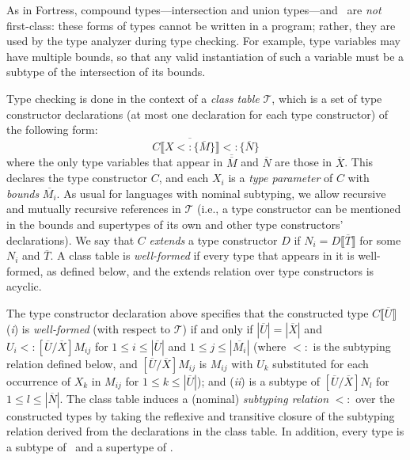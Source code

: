\documentclass[10pt]{sigplanconf}
\newcommand{\TODO}[1]{\textbf{\emph{\textcolor{red}{TODO}}}: \textsf{\footnotesize #1}}
\renewcommand{\bar}{\overline}
\newcommand{\extends}{\ensuremath{<:}}
\newcommand{\subtypeof}{\ensuremath{<:}}
\newcommand{\ob}[1]{\ensuremath{\llbracket {#1} \rrbracket}}
\newcommand{\obb}[1]{\ensuremath{\llbracket \bar{#1} \rrbracket}}
\newcommand{\bd}[1]{\ensuremath{\{\bar{#1}\}}}
\newcommand{\substb}[2]{\ensuremath{[\bar{#1}/\bar{#2}]}}
\newcommand{\bds}[2]{\ensuremath{\bar{{#1} \extends \bd{#2}}}}
\newcommand{\tplist}[2]{\ensuremath{\ob{\bds{#1}{#2}}}}
\newcommand{\T}{\ensuremath{\mathcal{T}}}
\newcommand{\Any}{\TYP{Any}}
\newcommand{\Bottom}{\TYP{Bottom}}
\begin{document}
As in Fortress, 
compound types---intersection and union types---and \Bottom\ 
are \emph{not} first-class:
these forms of types cannot be written in a program; 
rather, they are used by the type analyzer during type checking.
For example, type variables may have multiple bounds, 
so that any valid instantiation of such a variable
must be a subtype of the intersection of its bounds.

Type checking is done in the context of a \emph{class table} $\T$, 
which is a set of type constructor declarations 
(at most one declaration for each type constructor) 
of the following form:
\[
C\tplist{X}{M} \extends \{\bar{N}\}
\]
where the only type variables that appear in $\bar{\bar{M}}$ and $\bar{N}$ 
are those in $\bar{X}$.
This declares the type constructor $C$, 
and each $X_i$ is a \emph{type parameter} of $C$ 
with \emph{bounds} $\bar{M_i}$.
As usual for languages with nominal subtyping, 
we allow recursive and mutually recursive references in $\T$ 
(i.e., a type constructor can be mentioned 
in the bounds and supertypes of its own and other type constructors' declarations).
We say that $C$ \emph{extends} a type constructor $D$ 
if $N_i = D\obb{T}$ for some $N_i$ and $\bar{T}$.
A class table is \emph{well-formed} 
if every type that appears in it is well-formed,
as defined below, 
and the extends relation over type constructors is acyclic.




The type constructor declaration above 
specifies that the constructed type $C\obb{U}$ 
(\emph{i}) is \emph{well-formed} (with respect to $\T$)
if and only if $|\bar{U}| = |\bar{X}|$ and
$U_i \subtypeof \substb{U}{X}M_{ij}$ 
for $1 \leq i \leq |\bar{U}|$ and $1 \leq j \leq |\bar{M_i}|$ 
(where $\subtypeof$ is the subtyping relation defined below, 
and $\substb{U}{X}M_{ij}$ is $M_{ij}$ 
with $U_k$ substituted 
for each occurrence of $X_k$ in $M_{ij}$ 
for $1 \leq k \leq |\bar{U}|$);
and 
(\emph{ii}) is a subtype of $\substb{U}{X}N_l$ for $1 \leq l \leq |\bar{N}|$.
The class table induces 
a (nominal) \emph{subtyping relation} $\subtypeof$ over the constructed types 
by taking the reflexive and transitive closure 
of the subtyping relation derived from the declarations in the class table.
In addition, 
every type is a subtype of \Any\ and a supertype of \Bottom.
\end{document}
